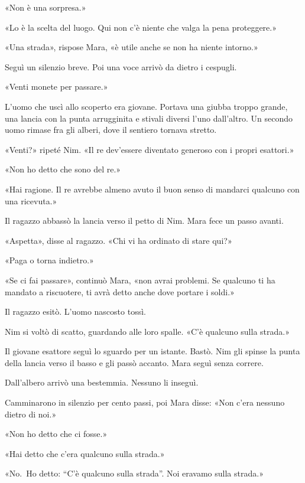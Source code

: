 \documentclass[10pt,a4paper]{article}
\begin{document}
«Non è una sorpresa.»

«Lo è la scelta del luogo. Qui non c'è niente che valga la pena proteggere.»

«Una strada», rispose Mara, «è utile anche se non ha niente intorno.»

Seguì un silenzio breve. Poi una voce arrivò da dietro i cespugli.

«Venti monete per passare.»

L'uomo che uscì allo scoperto era giovane. Portava una giubba troppo grande, una lancia con la punta arrugginita e stivali diversi l'uno dall'altro. Un secondo uomo rimase fra gli alberi, dove il sentiero tornava stretto.

«Venti?» ripeté Nim. «Il re dev'essere diventato generoso con i propri esattori.»

«Non ho detto che sono del re.»

«Hai ragione. Il re avrebbe almeno avuto il buon senso di mandarci qualcuno con una ricevuta.»

Il ragazzo abbassò la lancia verso il petto di Nim. Mara fece un passo avanti.

«Aspetta», disse al ragazzo. «Chi vi ha ordinato di stare qui?»

«Paga o torna indietro.»

«Se ci fai passare», continuò Mara, «non avrai problemi. Se qualcuno ti ha mandato a riscuotere, ti avrà detto anche dove portare i soldi.»

Il ragazzo esitò. L'uomo nascosto tossì.

Nim si voltò di scatto, guardando alle loro spalle. «C'è qualcuno sulla strada.»

Il giovane esattore seguì lo sguardo per un istante. Bastò. Nim gli spinse la punta della lancia verso il basso e gli passò accanto. Mara seguì senza correre.

Dall'albero arrivò una bestemmia. Nessuno li inseguì.

Camminarono in silenzio per cento passi, poi Mara disse: «Non c'era nessuno dietro di noi.»

«Non ho detto che ci fosse.»

«Hai detto che c'era qualcuno sulla strada.»

«No.~Ho detto: “C'è qualcuno sulla strada”. Noi eravamo sulla strada.»
\end{document}
